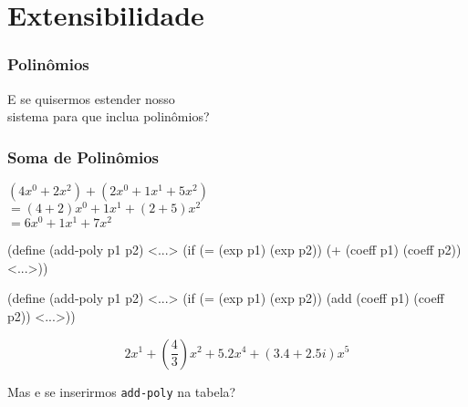 \section{Extensibilidade}
\begin{frame}
  \frametitle{Polinômios}
  \begin{center}
    E se quisermos estender nosso \\
    sistema para que inclua polinômios?
  \end{center}
\end{frame}



\begin{frame}
  \frametitle{Soma de Polinômios}

  $(4x^0 + 2x^2) + (2x^0 + 1x^1 + 5x^2)$\\
  \pause
  \vspace{2em}
  $= (4 + 2)x^0 + 1x^1 + (2 + 5)x^2$\\
  \pause
  \vspace{2em}
  $= 6x^0 + 1x^1 + 7x^2$
\end{frame}



\begin{frame}[fragile]
  \begin{code}
(define (add-poly p1 p2)
  <...>
  (if (= (exp p1) (exp p2))
      (+ (coeff p1) (coeff p2))
      <...>))
  \end{code}
\end{frame}



\begin{frame}[fragile]
  \begin{code}
(define (add-poly p1 p2)
  <...>
  (if (= (exp p1) (exp p2))
      (add (coeff p1) (coeff p2))
      <...>))
  \end{code}
\end{frame}



\begin{frame}[fragile]
  \[2x^1 + \left(\dfrac{4}{3}\right)x^2 + 5.2x^4 + (3.4 + 2.5i)x^5\]

  \pause
  \vspace{2em}
  \begin{center}
    Mas e se inserirmos \texttt{add-poly} na tabela?
  \end{center}
\end{frame}


